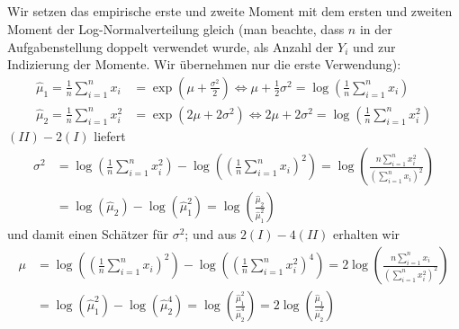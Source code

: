 \documentclass[a4paper]{article}
\begin{document}
\subsection{}

Wir setzen das empirische erste und zweite Moment mit dem ersten und zweiten Moment der Log-Normalverteilung gleich (man beachte, dass $n$ in der Aufgabenstellung doppelt verwendet wurde, als Anzahl der $Y_i$ und zur Indizierung der Momente. Wir übernehmen nur die erste Verwendung):
\begin{align*}
    \hat{\mu}_1 = \frac{1}{n} \sum_{i = 1}^{n} x_i &= \exp\left(\mu + \frac{\sigma^2}{2}\right) \iff \mu + \frac{1}{2} \sigma^2 = \log\left( \frac{1}{n} \sum_{i = 1}^{n} x_i \right) \tag{I}\\
    \hat{\mu}_2 = \frac{1}{n} \sum_{i = 1}^{n} x_i^2 &= \exp\left( 2 \mu + 2 \sigma^2 \right) \iff 2\mu + 2 \sigma^2 = \log\left( \frac{1}{n} \sum_{i=1}^{n} x_i^2 \right) \tag{II}
\end{align*}
$(II) - 2 (I)$ liefert 
\begin{align*}
    \sigma^2 &= \log\left( \frac{1}{n} \sum_{i=1}^{n} x_i^2 \right) - \log\left(\left( \frac{1}{n} \sum_{i = 1}^{n} x_i \right)^2 \right) = \log \left( \frac{n \sum_{i=1}^{n} x_i^2}{\left(\sum_{i=1}^{n}x_i\right)^2}\right)\\
    &= \log(\hat{\mu}_2) - \log(\hat{\mu}_1^2) = \log\left(\frac{\hat{\mu}_2}{\hat{\mu}_1^2}\right)  
\end{align*}
und damit einen Schätzer für $\sigma^2$; und aus $2 (I) - 4 (II)$ erhalten wir 
\begin{align*}
    \mu &= \log\left( \left( \frac{1}{n} \sum_{i = 1}^{n} x_i \right)^2 \right) - \log\left(\left( \frac{1}{n} \sum_{i=1}^{n} x_i^2 \right)^4\right) = 2 \log \left( \frac{n \sum_{i = 1}^{n} x_i}{\left(\sum_{i=1}^{n} x_i^2 \right)^2} \right)\\
    &= \log(\hat{\mu}_1^2) - \log(\hat{\mu}_2^4) = \log\left(\frac{\hat{\mu}_1^2}{\hat{\mu}_2^4}\right) = 2 \log\left(\frac{\hat{\mu}_1}{\hat{\mu}_2^2}\right)
\end{align*}

\subsection{}
\end{document}
